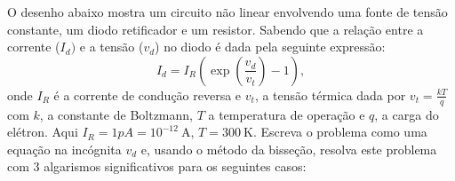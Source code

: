 \begin{Exercise}[title=Eletrônica]\label{prob_diodo} O desenho abaixo mostra um circuito não linear envolvendo uma fonte de tensão constante, um diodo retificador e um resistor. Sabendo que a relação entre a corrente ($I_d)$ e a tensão ($v_d$) no diodo é dada pela seguinte expressão:
  \begin{equation*}
    I_d=I_R\left(\exp\left(\frac{v_d}{v_t}\right)-1\right),
  \end{equation*}
onde $I_R$ é a corrente de condução reversa e $v_t$, a tensão térmica dada por $v_t=\frac{kT}{q}$ com $k$, a constante de Boltzmann, $T$ a temperatura de operação e $q$, a carga do elétron. Aqui  $I_R=1pA=10^{-12}~\mbox{A}$, $T=300~\mbox{K}$. Escreva o problema como uma equação na incógnita $v_d$ e, usando o método da bisseção, resolva este problema com 3 algarismos significativos para os seguintes casos:
\end{Exercise}
